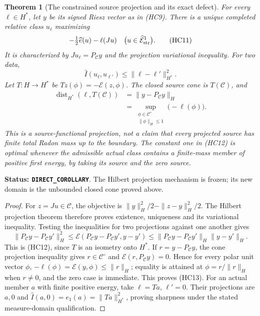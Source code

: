 \documentclass[11pt,a4paper]{article}
\numberwithin{equation}{section}
\newtheorem{theorem}{Theorem}[section]
\theoremstyle{definition}
\theoremstyle{remark}
\begin{document}
\begin{theorem}[The constrained source projection and its exact defect]
\label{thm:r11-strong-cone-source-projection}
For every $\ell\in H^*$, let $y$ be its signed Riesz vector
as in (HC9). There is a unique completed relative class
$u_\ell$ maximizing
\[
                  -\tfrac12\widehat e(u)-\ell(Ju)
                    \quad\bigl(u\in\widehat{\mathcal E}^1_{\rm str}\bigr).
 \tag{HC11}
\]
It is characterized by $Ju_\ell=P_{\mathcal C}y$ and the
projection variational inequality. For two data,
\[
            \widehat I(u_\ell,u_{\ell'})
                           \leq\|\ell-\ell'\|_{H^*}^2.
 \tag{HC12}
\]
Let $T:H\to H^*$ be $Tz(\phi)=-\mathcal E(z,\phi)$.
The closed source cone is $T(\mathcal C)$, and
\[
 \begin{split}
 \operatorname{dist}_{H^*}(\ell,T(\mathcal C))
   &=\|y-P_{\mathcal C}y\|_H\\
   &=\sup_{\substack{\phi\in\mathcal C^\circ\\\|\phi\|_H\leq1}}
                                      \bigl(-\ell(\phi)\bigr).
 \end{split}
 \tag{HC13}
\]
This is a source-functional projection, not a claim that every
projected source has finite total Radon mass up to the boundary.
The constant one in (HC12) is optimal whenever the admissible
actual class contains a finite-mass member of positive first
energy, by taking its source and the zero source.
\end{theorem}

\noindent\textbf{Status: \texttt{DIRECT\_COROLLARY}}. The Hilbert
projection mechanism is frozen; its new domain is the unbounded
closed cone proved above.

\begin{proof}
For $z=Ju\in\mathcal C$, the objective is
$\|y\|_H^2/2-\|z-y\|_H^2/2$. The Hilbert projection theorem
therefore proves existence, uniqueness and its variational
inequality. Testing the inequalities for two projections
against one another gives
\[
 \|P_{\mathcal C}y-P_{\mathcal C}y'\|_H^2
    \leq\mathcal E(P_{\mathcal C}y-P_{\mathcal C}y',y-y')
    \leq\|P_{\mathcal C}y-P_{\mathcal C}y'\|_H\|y-y'\|_H.
\]
This is (HC12), since $T$ is an isometry onto $H^*$.
If $r=y-P_{\mathcal C}y$, the cone projection inequality
gives $r\in\mathcal C^\circ$ and
$\mathcal E(r,P_{\mathcal C}y)=0$. Hence for every polar
unit vector $\phi$,
$-\ell(\phi)=\mathcal E(y,\phi)\leq\|r\|_H$;
equality is attained at $\phi=r/\|r\|_H$ when $r\ne0$,
and the zero case is immediate. This proves (HC13).
For an actual member $a$ with finite positive energy, take
$\ell=Ta$, $\ell'=0$. Their projections are $a,0$ and
$\widehat I(a,0)=e_1(a)=\|Ta\|_{H^*}^2$, proving sharpness
under the stated measure-domain qualification.
\end{proof}
\end{document}
